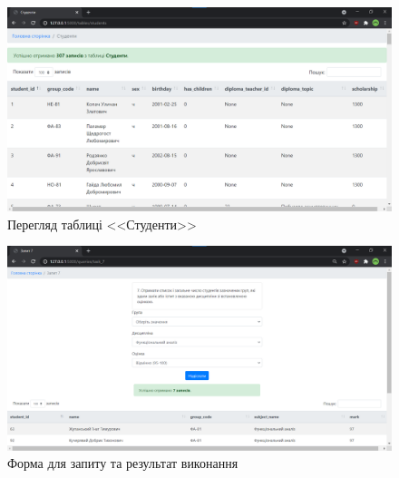 \begin{figure}[H]
    \centering
    \includegraphics[scale=0.38]{pics/web_table.png}
    \caption{Перегляд таблиці <<Студенти>>}
\end{figure}

\begin{figure}[H]
    \centering
    \includegraphics[scale=0.38]{pics/web_query.png}
    \caption{Форма для запиту та результат виконання}
\end{figure}

